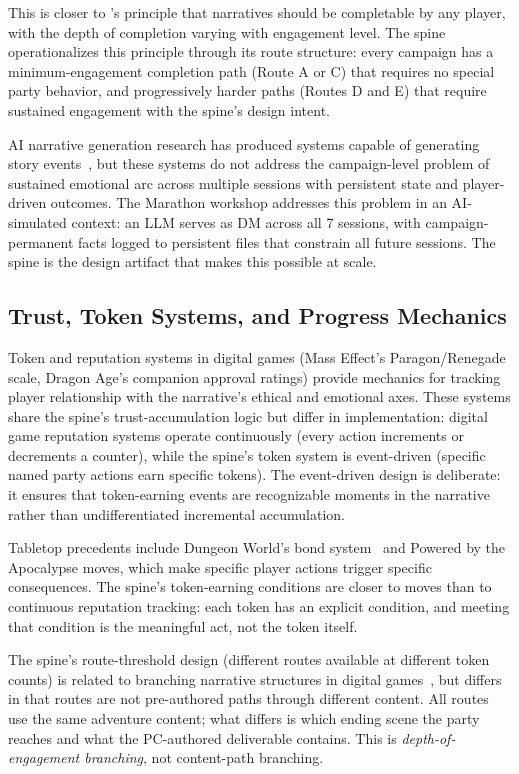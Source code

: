 This is closer to \citet{ryan2017narrative}'s principle that narratives should be
completable by any player, with the depth of completion varying with engagement
level. The spine operationalizes this principle through its route structure: every
campaign has a minimum-engagement completion path (Route A or C) that requires
no special party behavior, and progressively harder paths (Routes D and E) that
require sustained engagement with the spine's design intent.

AI narrative generation research has produced systems capable of generating
story events~\cite{ammanabrolu2021, fan2019}, but these systems do not address
the campaign-level problem of sustained emotional arc across multiple sessions
with persistent state and player-driven outcomes. The Marathon workshop addresses
this problem in an AI-simulated context: an LLM serves as DM across all 7 sessions,
with campaign-permanent facts logged to persistent files that constrain all
future sessions. The spine is the design artifact that makes this possible at
scale.

\subsection{Trust, Token Systems, and Progress Mechanics}

Token and reputation systems in digital games (Mass Effect's Paragon/Renegade
scale, Dragon Age's companion approval ratings) provide mechanics for tracking
player relationship with the narrative's ethical and emotional axes. These systems
share the spine's trust-accumulation logic but differ in implementation: digital
game reputation systems operate continuously (every action increments or decrements
a counter), while the spine's token system is event-driven (specific named
party actions earn specific tokens). The event-driven design is deliberate: it
ensures that token-earning events are recognizable moments in the narrative
rather than undifferentiated incremental accumulation.

Tabletop precedents include Dungeon World's bond system~\cite{koebel2012} and
Powered by the Apocalypse moves, which make specific player actions trigger
specific consequences. The spine's token-earning conditions are closer to moves
than to continuous reputation tracking: each token has an explicit condition,
and meeting that condition is the meaningful act, not the token itself.

The spine's route-threshold design (different routes available at different token
counts) is related to branching narrative structures in digital games~\cite{ryan2017narrative},
but differs in that routes are not pre-authored paths through different content.
All routes use the same adventure content; what differs is which ending scene
the party reaches and what the PC-authored deliverable contains. This is
\textit{depth-of-engagement branching}, not content-path branching.

